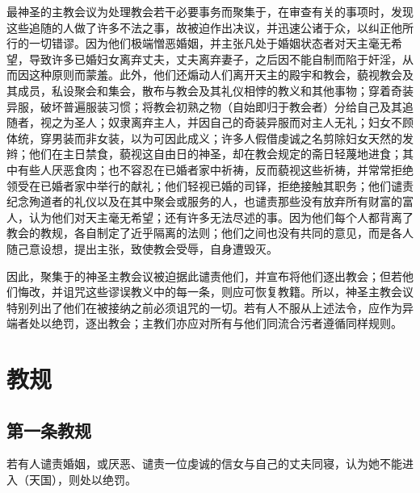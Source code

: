 最神圣的主教会议为处理教会若干必要事务而聚集于，在审查有关的事项时，发现这些追随的人做了许多不法之事，故被迫作出决议，并迅速公诸于众，以纠正他所行的一切错谬。因为他们极端憎恶婚姻，并主张凡处于婚姻状态者对天主毫无希望，导致许多已婚妇女离弃丈夫，丈夫离弃妻子，之后因不能自制而陷于奸淫，从而因这种原则而蒙羞。此外，他们还煽动人们离开天主的殿宇和教会，藐视教会及其成员，私设聚会和集会，散布与教会及其礼仪相悖的教义和其他事物；穿着奇装异服，破坏普遍服装习惯；将教会初熟之物（自始即归于教会者）分给自己及其追随者，视之为圣人；奴隶离弃主人，并因自己的奇装异服而对主人无礼；妇女不顾体统，穿男装而非女装，以为可因此成义；许多人假借虔诚之名剪除妇女天然的发辫；他们在主日禁食，藐视这自由日的神圣，却在教会规定的斋日轻蔑地进食；其中有些人厌恶食肉；也不容忍在已婚者家中祈祷，反而藐视这些祈祷，并常常拒绝领受在已婚者家中举行的献礼；他们轻视已婚的司铎，拒绝接触其职务；他们谴责纪念殉道者的礼仪以及在其中聚会或服务的人，也谴责那些没有放弃所有财富的富人，认为他们对天主毫无希望；还有许多无法尽述的事。因为他们每个人都背离了教会的教规，各自制定了近乎隔离的法则；他们之间也没有共同的意见，而是各人随己意设想，提出主张，致使教会受辱，自身遭毁灭。\par

因此，聚集于的神圣主教会议被迫据此谴责他们，并宣布将他们逐出教会；但若他们悔改，并诅咒这些谬误教义中的每一条，则应可恢复教籍。所以，神圣主教会议特别列出了他们在被接纳之前必须诅咒的一切。若有人不服从上述法令，应作为异端者处以绝罚，逐出教会；主教们亦应对所有与他们同流合污者遵循同样规则。\par


\section{教规}


\subsection{第一条教规}

若有人谴责婚姻，或厌恶、谴责一位虔诚的信女与自己的丈夫同寝，认为她不能进入（天国），则处以绝罚。\par


